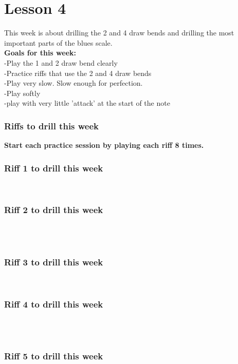 \part*{Lesson 4}
This week is about drilling the 2 and 4 draw bends and drilling the most important parts of the blues scale. \\



\textbf{Goals for this week:}\\
-Play the 1 and 2 draw bend clearly\\
-Practice riffs that use the 2 and 4 draw bends\\
-Play very slow. Slow enough for perfection. \\
-Play softly \\
-play with very little 'attack' at the start of the note\\

\section{Riffs to drill this week}
\textbf{Start each practice session by playing each riff 8 times.
}
\section{Riff 1 to drill this week}
        \4\fdb\3\2   \\

\section{Riff 2 to drill this week}
        \4\4\4\4\\
        \4\fdb\3\2   \\
\section{Riff 3 to drill this week}
        \2 \tdb \1 \1\\
        
        
\section{Riff 4 to drill this week}
        \2\2\2\2\\
        \2 \tdb \1 \1\\
        
\section{Riff 5 to drill this week}        
\1\odb\1\\
\1\odb\one


